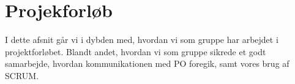 \section{Projekforløb}
\label{sec:projekt}
I dette afsnit går vi i dybden med, hvordan vi som gruppe har arbejdet i projektforløbet.
Blandt andet,  hvordan vi som gruppe sikrede et godt samarbejde, hvordan kommunikationen med PO foregik, samt vores brug af SCRUM.



